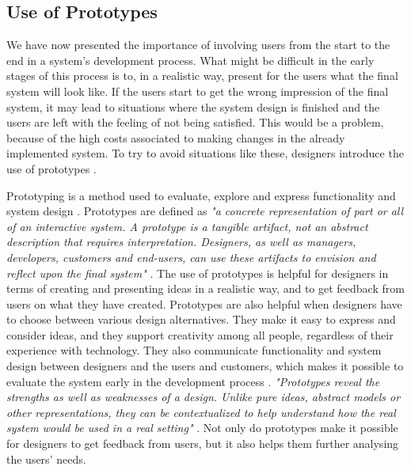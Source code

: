 \subsection{Use of Prototypes}
\label{sec:prototypes}
We have now presented the importance of involving users from the start to the end in a system's development process. What might be difficult in the early stages of this process is to, in a realistic way, present for the users what the final system will look like. If the users start to get the wrong impression of the final system, it may lead to situations where the system design is finished and the users are left with the feeling of not being satisfied. This would be a problem, because of the high costs associated to making changes in the already implemented system. To try to avoid situations like these, designers introduce the use of prototypes \cite{mmi}. 

Prototyping is a method used to evaluate, explore and express functionality and system design \cite{houde1997prototypes}. Prototypes are defined as \emph{"a concrete representation of part or all of an interactive system. A prototype is a tangible artifact, not an abstract description that requires interpretation. Designers, as well as managers, developers, customers and end-users, can use these artifacts to envision and reflect upon the final system"} \cite{mackayprototyping}. The use of prototypes is helpful for designers in terms of creating and presenting ideas in a realistic way, and to get feedback from users on what they have created. Prototypes are also helpful when designers have to choose between various design alternatives. They make it easy to express and consider ideas, and they support creativity among all people, regardless of their experience with technology. They also communicate functionality and system design between designers and the users and customers, which makes it possible to evaluate the system early in the development process \cite{mackayprototyping} \cite{mmi}. \emph{"Prototypes reveal the strengths as well as weaknesses of a design. Unlike pure ideas, abstract models or other representations, they can be contextualized to help understand how the real system would be used in a real setting"} \cite{mackayprototyping}. Not only do prototypes make it possible for designers to get feedback from users, but it also helps them further analysing the users' needs. 

